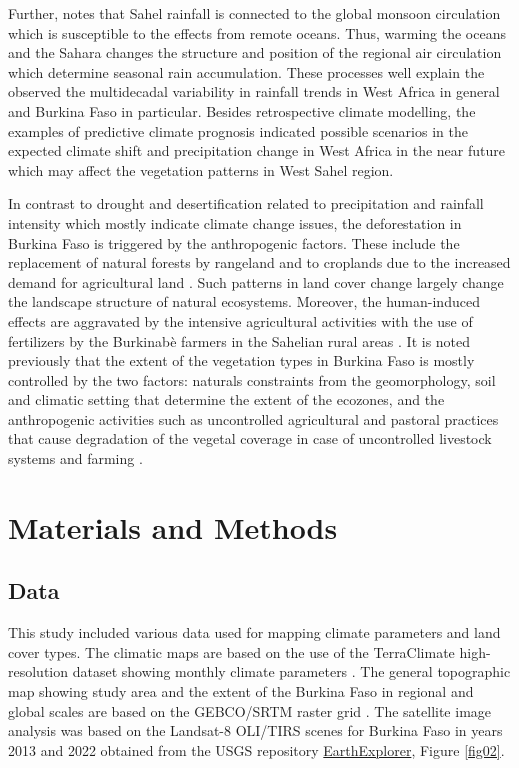 \documentclass[knowledge,article,submit,pdftex,moreauthors]{Definitions/mdpi}
\begin{document}
Further, \cite{Biasutti} notes that Sahel rainfall is connected to the global monsoon circulation which is susceptible to the effects from remote oceans. Thus, warming the oceans and the Sahara changes the structure and position of the regional air circulation which determine seasonal rain accumulation. These processes well explain the observed the multidecadal variability in rainfall trends in West Africa in general and Burkina Faso in particular. Besides retrospective climate modelling, the examples of predictive climate prognosis \cite{Gaetani} indicated possible scenarios in the expected climate shift and precipitation change in West Africa in the near future which may affect the vegetation patterns in West Sahel region. 

In contrast to drought and desertification related to precipitation and rainfall intensity which mostly indicate climate change issues, the deforestation in Burkina Faso is triggered by the anthropogenic factors. These include the replacement of natural forests by rangeland and to croplands due to the increased demand for agricultural land \cite{ETONGO201551}. Such patterns in land cover change largely change the landscape structure of natural ecosystems. Moreover, the human-induced effects are aggravated by the intensive agricultural activities with the use of fertilizers by the Burkinabè farmers in the Sahelian rural areas \cite{agronomy11122431}. It is noted previously that the extent of the vegetation types in Burkina Faso is mostly controlled by the two factors: naturals constraints from the geomorphology, soil and climatic setting that determine the extent of the ecozones, and the anthropogenic activities such as uncontrolled agricultural and pastoral practices that cause degradation of the vegetal coverage in case of uncontrolled livestock systems and farming \cite{Bandre}. 

\section{Materials and Methods}

\subsection{Data}
This study included various data used for mapping climate parameters and land cover types. The climatic maps are based on the use of the TerraClimate high-resolution dataset showing monthly climate parameters \cite{Abatzoglou}. The general topographic map showing study area and the extent of the Burkina Faso in regional and global scales are based on the GEBCO/SRTM raster grid \cite{GEBCO}. The satellite image analysis was based on the Landsat-8 OLI/TIRS scenes \cite{USGS} for Burkina Faso in years 2013 and 2022 obtained from the USGS repository \href{https://earthexplorer.usgs.gov/}{EarthExplorer}, Figure \ref{fig02}. 
\end{document}
